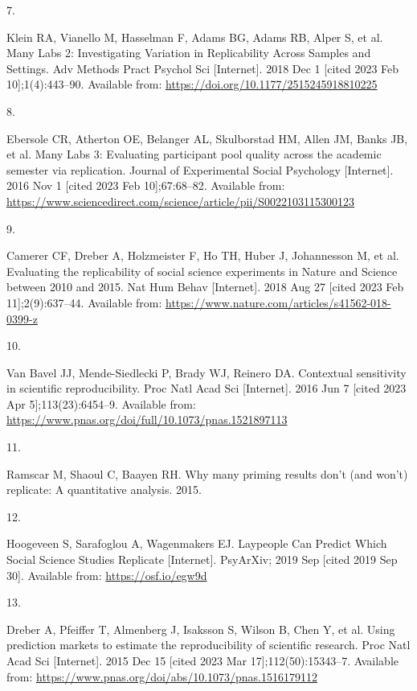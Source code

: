 \documentclass[
  english,
  a4paper,
]{article}
\newlength{\cslhangindent}
\newlength{\csllabelwidth}
\newlength{\cslentryspacingunit} %
\newenvironment{CSLReferences}[2] %
 {%
  \setlength{\parindent}{0pt}
  \ifodd #1
  \let\oldpar\par
  \def\par{\hangindent=\cslhangindent\oldpar}
  \fi
  \setlength{\parskip}{#2\cslentryspacingunit}
 }%
 {}
\newcommand{\CSLLeftMargin}[1]{\parbox[t]{\csllabelwidth}{#1}}
\newcommand{\CSLRightInline}[1]{\parbox[t]{\linewidth - \csllabelwidth}{#1}\break}
\begin{document}
\begin{CSLReferences}{0}{0}
\leavevmode{}%
\CSLLeftMargin{7. }%
\CSLRightInline{Klein RA, Vianello M, Hasselman F, Adams BG, Adams RB, Alper S, et al. Many {Labs} 2: {Investigating Variation} in {Replicability Across Samples} and {Settings}. Adv Methods Pract Psychol Sci {[}Internet{]}. 2018 Dec 1 {[}cited 2023 Feb 10{]};1(4):443--90. Available from: \url{https://doi.org/10.1177/2515245918810225}}

\leavevmode{}%
\CSLLeftMargin{8. }%
\CSLRightInline{Ebersole CR, Atherton OE, Belanger AL, Skulborstad HM, Allen JM, Banks JB, et al. Many {Labs} 3: {Evaluating} participant pool quality across the academic semester via replication. Journal of Experimental Social Psychology {[}Internet{]}. 2016 Nov 1 {[}cited 2023 Feb 10{]};67:68--82. Available from: \url{https://www.sciencedirect.com/science/article/pii/S0022103115300123}}

\leavevmode{}%
\CSLLeftMargin{9. }%
\CSLRightInline{Camerer CF, Dreber A, Holzmeister F, Ho TH, Huber J, Johannesson M, et al. Evaluating the replicability of social science experiments in {Nature} and {Science} between 2010 and 2015. Nat Hum Behav {[}Internet{]}. 2018 Aug 27 {[}cited 2023 Feb 11{]};2(9):637--44. Available from: \url{https://www.nature.com/articles/s41562-018-0399-z}}

\leavevmode{}%
\CSLLeftMargin{10. }%
\CSLRightInline{Van Bavel JJ, Mende-Siedlecki P, Brady WJ, Reinero DA. Contextual sensitivity in scientific reproducibility. Proc Natl Acad Sci {[}Internet{]}. 2016 Jun 7 {[}cited 2023 Apr 5{]};113(23):6454--9. Available from: \url{https://www.pnas.org/doi/full/10.1073/pnas.1521897113}}

\leavevmode{}%
\CSLLeftMargin{11. }%
\CSLRightInline{Ramscar M, Shaoul C, Baayen RH. Why many priming results don't (and won't) replicate: {A} quantitative analysis. 2015. }

\leavevmode{}%
\CSLLeftMargin{12. }%
\CSLRightInline{Hoogeveen S, Sarafoglou A, Wagenmakers EJ. Laypeople {Can Predict Which Social Science Studies Replicate} {[}Internet{]}. {PsyArXiv}; 2019 Sep {[}cited 2019 Sep 30{]}. Available from: \url{https://osf.io/egw9d}}

\leavevmode{}%
\CSLLeftMargin{13. }%
\CSLRightInline{Dreber A, Pfeiffer T, Almenberg J, Isaksson S, Wilson B, Chen Y, et al. Using prediction markets to estimate the reproducibility of scientific research. Proc Natl Acad Sci {[}Internet{]}. 2015 Dec 15 {[}cited 2023 Mar 17{]};112(50):15343--7. Available from: \url{https://www.pnas.org/doi/abs/10.1073/pnas.1516179112}}


\end{CSLReferences}
\end{document}
